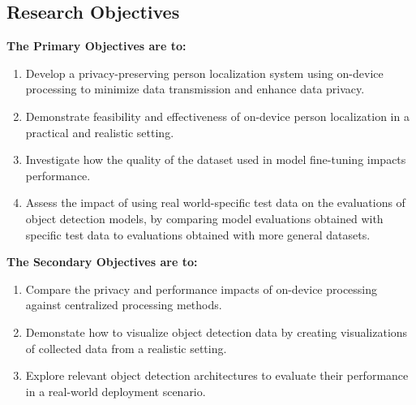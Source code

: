 \subsection{Research Objectives}
\label{sec:research_objectives}
\textbf{The Primary Objectives are to:}
\begin{enumerate}
	\item Develop a privacy-preserving person localization system using on-device processing to minimize data transmission and enhance data privacy.
	\item Demonstrate feasibility and effectiveness of on-device person localization in a practical and realistic setting.
	\item Investigate how the quality of the dataset used in model fine-tuning impacts performance.
	\item Assess the impact of using real world-specific test data on the evaluations of object detection models, by comparing model evaluations obtained with specific test data to evaluations obtained with more general datasets.
\end{enumerate}

\textbf{The Secondary Objectives are to:}
\begin{enumerate}
	\item Compare the privacy and performance impacts of on-device processing against centralized processing methods.
	\item Demonstate how to visualize object detection data by creating visualizations of collected data from a realistic setting.
	\item Explore relevant object detection architectures to evaluate their performance in a real-world deployment scenario.
\end{enumerate}

